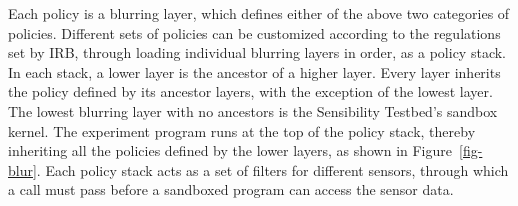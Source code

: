 %
Each policy is a blurring layer, which defines either of the above
two categories of policies. Different sets of policies can be customized 
according to the regulations set by IRB, through loading 
individual blurring layers in order, as a policy stack. In each stack, 
a lower layer is the ancestor of a higher layer. Every layer inherits 
the policy defined by its ancestor layers, with the exception of the lowest layer. 
The lowest blurring layer with no ancestors is the 
Sensibility Testbed's sandbox kernel. The experiment program runs at the top 
of the policy stack, thereby inheriting all the policies defined by the
lower layers, as shown in Figure~\ref{fig-blur}. 
Each policy stack acts as a set of filters for different sensors, through 
which a call must pass before a sandboxed program can
access the sensor data. 





